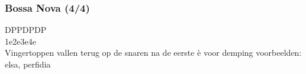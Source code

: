 \subsubsection*{Bossa Nova (4/4)}
D\hspace{1.8em}P\hspace{1.8em}\hphantom{D}\hspace{1.9em}P\hspace{1.8em}D\hspace{1.8em}P\hspace{1.8em}D\hspace{1.9em}P\\
1\hspace{2em}e\hspace{2em}2\hspace{2em}e\hspace{2em}3\hspace{2em}e\hspace{2em}4\hspace{2em}e\\
Vingertoppen vallen terug op de snaren na de eerste è voor demping
voorbeelden: elsa, perfidia